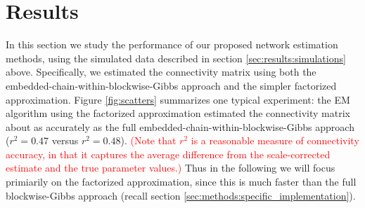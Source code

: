 \documentclass[aoas,preprint]{imsart}
\providecommand{\tr}[1]{\textcolor{red}{#1}}
\begin{document}
\section{Results}
\label{sec:results}

In this section we study the performance of our proposed network
estimation methods, using the simulated data described in section
\ref{sec:results:simulations} above.  Specifically, we estimated the
connectivity matrix using both the
embedded-chain-within-blockwise-Gibbs approach and the simpler
factorized approximation.  Figure \ref{fig:scatters} summarizes one
typical experiment: the EM algorithm using the factorized
approximation estimated the connectivity matrix about as accurately as
the full embedded-chain-within-blockwise-Gibbs approach ($r^2=0.47$
versus $r^2=0.48$).  \tr{(Note that $r^2$ is a reasonable measure of connectivity accuracy, in that it captures the average difference from the scale-corrected estimate and the true parameter values.)} Thus in the following we will focus primiarily on the factorized approximation, since this is much faster than the full
blockwise-Gibbs approach (recall section
\ref{sec:methods:specific_implementation}).
\end{document}
